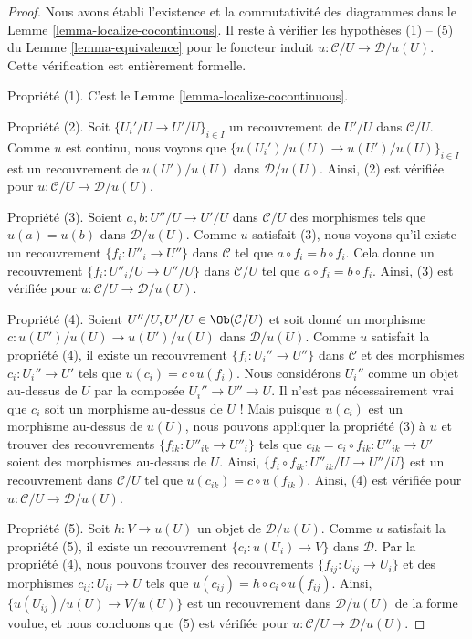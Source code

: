 \begin{proof}
Nous avons établi l’existence et la commutativité des diagrammes dans le
Lemme \ref{lemma-localize-cocontinuous}. Il reste à vérifier
les hypothèses (1) -- (5) du Lemme \ref{lemma-equivalence} pour le
foncteur induit $u : \mathcal{C}/U \to \mathcal{D}/u(U)$.
Cette vérification est entièrement formelle.

\medskip\noindent
Propriété (1). C’est le Lemme \ref{lemma-localize-cocontinuous}.

\medskip\noindent
Propriété (2). Soit $\{U_i'/U \to U'/U\}_{i \in I}$ un recouvrement
de $U'/U$ dans $\mathcal{C}/U$. Comme $u$ est continu, nous voyons que
$\{u(U_i')/u(U) \to u(U')/u(U)\}_{i \in I}$ est un recouvrement
de $u(U')/u(U)$ dans $\mathcal{D}/u(U)$. Ainsi, (2) est vérifiée
pour $u : \mathcal{C}/U \to \mathcal{D}/u(U)$.

\medskip\noindent
Propriété (3). Soient $a, b : U''/U \to U'/U$ dans $\mathcal{C}/U$
des morphismes tels que $u(a) = u(b)$ dans $\mathcal{D}/u(U)$.
Comme $u$ satisfait (3), nous voyons qu’il existe un recouvrement
$\{f_i : U''_i \to U''\}$ dans $\mathcal{C}$ tel que
$a \circ f_i = b \circ f_i$. Cela donne un recouvrement
$\{f_i : U''_i/U \to U''/U\}$ dans $\mathcal{C}/U$ tel que
$a \circ f_i = b \circ f_i$. Ainsi, (3) est vérifiée
pour $u : \mathcal{C}/U \to \mathcal{D}/u(U)$.

\medskip\noindent
Propriété (4). Soient $U''/U, U'/U \in \Ob(\mathcal{C}/U)$ et
soit donné un morphisme $c : u(U'')/u(U) \to u(U')/u(U)$ dans $\mathcal{D}/u(U)$.
Comme $u$ satisfait la propriété (4), il existe
un recouvrement $\{f_i : U_i'' \to U''\}$ dans $\mathcal{C}$
et des morphismes $c_i : U_i'' \to U'$ tels que $u(c_i) = c \circ u(f_i)$.
Nous considérons $U_i''$ comme un objet au-dessus de $U$ par la composée
$U_i'' \to U'' \to U$.
Il n’est pas nécessairement vrai que $c_i$ soit un morphisme au-dessus de $U$ !
Mais puisque $u(c_i)$ est un morphisme au-dessus de $u(U)$, nous pouvons appliquer
la propriété (3) à $u$ et trouver des recouvrements $\{f_{ik} : U''_{ik} \to U''_i\}$
tels que $c_{ik} = c_i \circ f_{ik} : U''_{ik} \to U'$ soient des morphismes au-dessus de $U$.
Ainsi, $\{f_i \circ f_{ik} : U''_{ik}/U \to U''/U\}$ est un recouvrement
dans $\mathcal{C}/U$ tel que $u(c_{ik}) = c \circ u(f_{ik})$.
Ainsi, (4) est vérifiée
pour $u : \mathcal{C}/U \to \mathcal{D}/u(U)$.

\medskip\noindent
Propriété (5). Soit $h : V \to u(U)$ un objet de $\mathcal{D}/u(U)$.
Comme $u$ satisfait la propriété (5), il existe un recouvrement
$\{c_i : u(U_i) \to V\}$ dans $\mathcal{D}$. Par la propriété (4), nous pouvons trouver
des recouvrements $\{f_{ij} : U_{ij} \to U_i\}$ et des morphismes
$c_{ij} : U_{ij} \to U$ tels que $u(c_{ij}) = h \circ c_i \circ u(f_{ij})$.
Ainsi, $\{u(U_{ij})/u(U) \to V/u(U)\}$ est un recouvrement dans
$\mathcal{D}/u(U)$ de la forme voulue, et nous concluons que
(5) est vérifiée pour $u : \mathcal{C}/U \to \mathcal{D}/u(U)$.
\end{proof}

